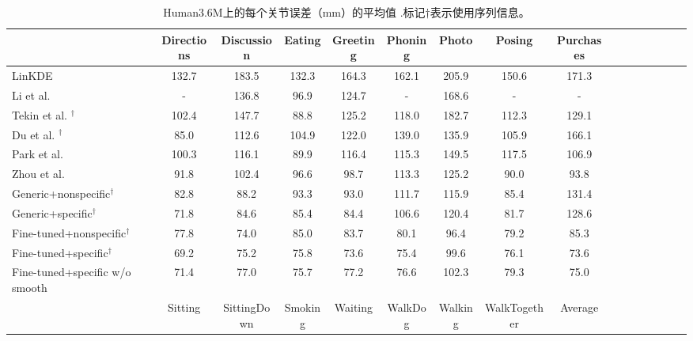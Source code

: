 \begin{table}
\footnotesize
\caption{Human3.6M上的每个关节误差（mm）的平均值 \cite{ionescu2014human}.标记$\dagger$表示使用序列信息。}
\centering
\renewcommand{\arraystretch}{0.5}
\renewcommand{\tabcolsep}{0.1 mm}
\begin{tabular}{l*{15}{c}}
\toprule
 & Directions & Discussion & Eating & Greeting & Phoning & Photo & Posing & Purchases \\
\toprule
LinKDE \cite{ionescu2014human} & 132.7 & 183.5 & 132.3 & 164.3 & 162.1 & 205.9 & 150.6 & 171.3 \\
Li et al. \cite{li2015maximum} & - & 136.8 & 96.9 & 124.7 & - & 168.6 & - & - \\
Tekin et al. \cite{tekin2015predicting}$^\dagger$ & 102.4 & 147.7 & 88.8 & 125.2 & 118.0 & 182.7 & 112.3 & 129.1 \\
Du et al. \cite{du2016marker}$^\dagger$  &        85.0 &       112.6 &        104.9 &        122.0 &        139.0 &        135.9 &        105.9 &        166.1 \\
Park et al. \cite{park20163d}  &         100.3 &        116.1 &        89.9 &        116.4 &        115.3 &        149.5 & 117.5 &        106.9 \\
Zhou et al. \cite{zhou2016deep}  &        91.8 &        102.4 &        96.6 &        98.7 &        113.3 &        125.2 &       90.0 &        93.8 \\
Generic+nonspecific$^\dagger$ & 82.8 &         88.2 &         93.3 &         93.0 &        111.7 &        115.9 &         85.4 &        131.4 \\
Generic+specific$^\dagger$ & 71.8 &         84.6 &         85.4 &         84.4 &        106.6 &        120.4 &         81.7 &        128.6 \\
Fine-tuned+nonspecific$^\dagger$ & 77.8 &         74.0 &         85.0 &         83.7 &         80.1 &         96.4 &         79.2 &         85.3 \\
Fine-tuned+specific$^\dagger$ & 69.2 &         75.2 &         75.8 &         73.6 &         75.4 &         99.6 &         76.1 &         73.6 \\
Fine-tuned+specific w/o smooth & 71.4 &         77.0 &         75.7 &         77.2 &         76.6 &        102.3 &         79.3 &         75.0 \\
\toprule
 & Sitting & SittingDown & Smoking & Waiting & WalkDog & Walking & WalkTogether & Average \\

\end{tabular}
\end{table}
